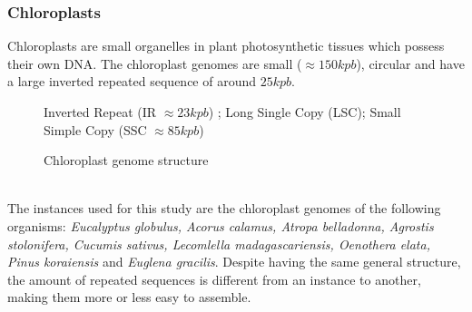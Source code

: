 \documentclass[10pt, twocolumn]{article}
\begin{document}
\subsubsection{Chloroplasts}
Chloroplasts are small organelles in plant photosynthetic tissues which possess their own DNA. The chloroplast genomes are small ($\approx 150kpb$), circular and have a large inverted repeated sequence of around $25kpb$. 
\begin{figure}[h!]
\centering
{}
\caption{Chloroplast genome structure}
{\footnotesize Inverted Repeat (IR $ \approx 23kpb$) ; Long Single Copy (LSC); Small Simple Copy (SSC $\approx 85kpb$)}
\end{figure} \\
The instances used for this study are the chloroplast genomes of the following organisms: \textit{Eucalyptus globulus, Acorus calamus, Atropa belladonna, Agrostis stolonifera, Cucumis sativus, Lecomlella madagascariensis, Oenothera elata, Pinus koraiensis} and \textit{Euglena gracilis}. Despite having the same general structure, the amount of repeated sequences is different from an instance to another, making them more or less easy to assemble.
\end{document}
